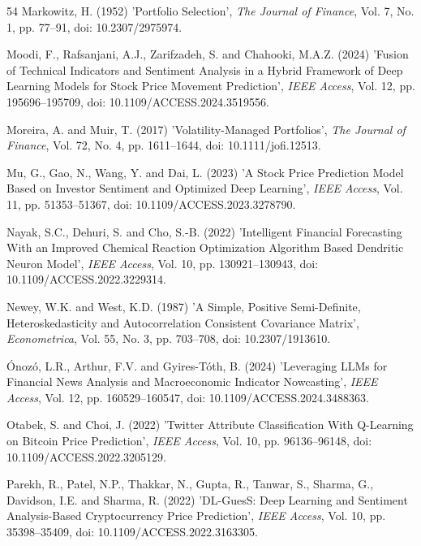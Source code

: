 \documentclass{singlecol-new}
\theoremstyle{TH}{
\newtheorem{lemma}{Lemma}
\newtheorem{theorem}[lemma]{Theorem}
\newtheorem{corrolary}[lemma]{Corrolary}
\newtheorem{conjecture}[lemma]{Conjecture}
\newtheorem{proposition}[lemma]{Proposition}
\newtheorem{claim}[lemma]{Claim}
\newtheorem{stheorem}[lemma]{Wrong Theorem}
\newtheorem{algorithm}{Algorithm}
}
\theoremstyle{THrm}{
\newtheorem{definition}{Definition}[section]
\newtheorem{question}{Question}[section]
\newtheorem{remark}{Remark}
\newtheorem{scheme}{Scheme}
}
\theoremstyle{THhit}{
\newtheorem{case}{Case}[section]
}
\begin{document}
\begin{thebibliography}{54}
Markowitz, H. (1952) 'Portfolio Selection', {\it The Journal of Finance}, Vol. 7, No. 1, pp. 77--91, doi: 10.2307/2975974.

Moodi, F., Rafsanjani, A.J., Zarifzadeh, S. and Chahooki, M.A.Z. (2024) 'Fusion of Technical Indicators and Sentiment Analysis in a Hybrid Framework of Deep Learning Models for Stock Price Movement Prediction', {\it IEEE Access}, Vol. 12, pp. 195696--195709, doi: 10.1109/ACCESS.2024.3519556.

Moreira, A. and Muir, T. (2017) 'Volatility-Managed Portfolios', {\it The Journal of Finance}, Vol. 72, No. 4, pp. 1611--1644, doi: 10.1111/jofi.12513.

Mu, G., Gao, N., Wang, Y. and Dai, L. (2023) 'A Stock Price Prediction Model Based on Investor Sentiment and Optimized Deep Learning', {\it IEEE Access}, Vol. 11, pp. 51353--51367, doi: 10.1109/ACCESS.2023.3278790.

Nayak, S.C., Dehuri, S. and Cho, S.-B. (2022) 'Intelligent Financial Forecasting With an Improved Chemical Reaction Optimization Algorithm Based Dendritic Neuron Model', {\it IEEE Access}, Vol. 10, pp. 130921--130943, doi: 10.1109/ACCESS.2022.3229314.

Newey, W.K. and West, K.D. (1987) 'A Simple, Positive Semi-Definite, Heteroskedasticity and Autocorrelation Consistent Covariance Matrix', {\it Econometrica}, Vol. 55, No. 3, pp. 703--708, doi: 10.2307/1913610.

\'Onoz\'o, L.R., Arthur, F.V. and Gyires-T\'oth, B. (2024) 'Leveraging LLMs for Financial News Analysis and Macroeconomic Indicator Nowcasting', {\it IEEE Access}, Vol. 12, pp. 160529--160547, doi: 10.1109/ACCESS.2024.3488363.

Otabek, S. and Choi, J. (2022) 'Twitter Attribute Classification With Q-Learning on Bitcoin Price Prediction', {\it IEEE Access}, Vol. 10, pp. 96136--96148, doi: 10.1109/ACCESS.2022.3205129.

Parekh, R., Patel, N.P., Thakkar, N., Gupta, R., Tanwar, S., Sharma, G., Davidson, I.E. and Sharma, R. (2022) 'DL-GuesS: Deep Learning and Sentiment Analysis-Based Cryptocurrency Price Prediction', {\it IEEE Access}, Vol. 10, pp. 35398--35409, doi: 10.1109/ACCESS.2022.3163305.


\end{thebibliography}
\end{document}
